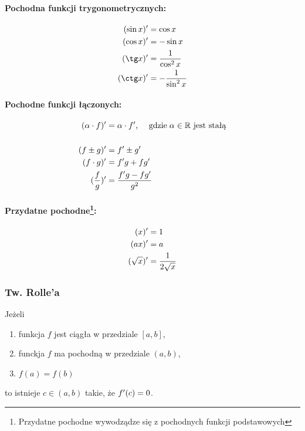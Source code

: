 \documentclass[../Matematyka.tex]{subfiles}
\begin{document}
    \paragraph{Pochodna funkcji trygonometrycznych:}
    \begin{align*}
        (\sin x)\prim &= \cos x \\
        (\cos x)\prim &= - \sin x \\
        (\tg x)\prim &= \frac{1}{\cos^2 x} \\
        (\ctg x)\prim &= - \frac{1}{\sin^2 x} \\
    \end{align*}

    \paragraph{Pochodne funkcji łączonych:}
    \begin{align*}
        (\alpha \cdot f)^\prime &= \alpha \cdot f^\prime \text{, \quad gdzie} \; \alpha \in \mathbb{R} \text{ jest stałą} \\
        \\
        (f \pm g)^\prime &= f^\prime \pm g^\prime \\
        (f \cdot g)^\prime &= f^\prime g + f g^\prime \\
        (\frac{f}{g})^\prime &= \frac{f^\prime g - f g^\prime}{g^2}
    \end{align*}

    \paragraph[Przydatne pochodne:]
        {Przydatne pochodne\footnote{Przydatne pochodne wywodządze się z pochodnych funkcji podstawowych}:}
    \begin{align*}
        (x)^\prime &= 1 \\
        (ax)^\prime &= a \\
        (\sqrt{x})^\prime &= \frac{1}{2\sqrt{x}} \\
    \end{align*}

    \subsubsection{Tw. Rolle'a}
    Jeżeli
    \begin{enumerate}
        \item funkcja \(f\) jest ciągła w przedziale \([a, b]\),
        \item funckja \(f\) ma pochodną w przedziale \((a, b)\),
        \item \(f(a) = f(b)\)
    \end{enumerate}
    to istnieje \(c \in (a, b)\) takie, że \(f^\prime(c) = 0\).
\end{document}
